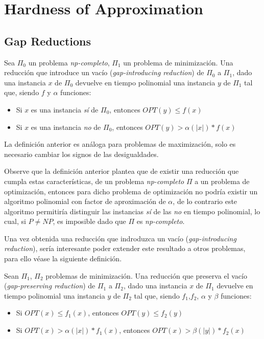 \documentclass[../np-approximations.tex]{subfiles}
\begin{document}
\section{Hardness of Approximation}

\subsection{Gap Reductions}

\begin{definition}
	Sea $\Pi_0$ un problema \emph{np-completo}, $\Pi_1$ un problema 
	de minimización. Una reducción que introduce un vacío
	(\emph{gap-introducing reduction}) de $\Pi_0$ a $\Pi_1$, dado 
	una instancia $x$ de $\Pi_0$ devuelve en tiempo polinomial una 
	instancia $y$ de $\Pi_1$ tal que, siendo $f$ y $\alpha$ 
	funciones:
	\begin{itemize}
		\item Si $x$ es una instancia \emph{sí} de $\Pi_0$, 
		      entonces $OPT(y) \le f(x)$
		\item Si $x$ es una instancia \emph{no} de $\Pi_0$, 
		      entonces $OPT(y) > \alpha(\vert x \vert)*f(x)$
	\end{itemize}
\end{definition}

\begin{note}
	La definición anterior es análoga para problemas de 
	maximización, solo es necesario cambiar los signos de las 
	desigualdades.
\end{note}

Observe que la definición anterior plantea que de existir una 
reducción que cumpla estas características, de un problema
\emph{np-completo} $\Pi$ a un problema de optimización, entonces 
para dicho problema de optimización no podría existir un algoritmo 
polinomial con factor de aproximación de $\alpha$, de lo contrario 
este algoritmo permitiría distinguir las instancias \emph{sí} de 
las \emph{no} en tiempo polinomial, lo cual, si $P \neq NP$, es 
imposible dado que $\Pi$ es \emph{np-completo}.

Una vez obtenida una reducción que indroduzca un vacío
(\emph{gap-introducing reduction}), sería interesante poder 
extender este resultado a otros problemas, para ello véase la 
siguiente definición.

\begin{definition}
	Sean $\Pi_1$, $\Pi_2$ problemas de minimización. Una reducción 
	que preserva el vacío (\emph{gap-preserving reduction}) de 
	$\Pi_1$ a $\Pi_2$, dado una instancia $x$ de $\Pi_1$ devuelve 
	en tiempo polinomial una instancia $y$ de $\Pi_2$ tal que, 
	siendo $f_1$,$f_2$, $\alpha$ y $\beta$ funciones:
	\begin{itemize}
		\item Si $OPT(x) \le f_1(x)$, entonces
		      $OPT(y) \le f_2(y)$
		\item Si $OPT(x) > \alpha(\vert x \vert)*f_1(x)$, entonces
		      $OPT(x) > \beta(\vert y \vert)*f_2(x)$
	\end{itemize}
\end{definition}
\end{document}
